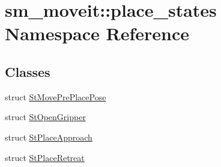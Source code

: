\hypertarget{namespacesm__moveit_1_1place__states}{}\section{sm\+\_\+moveit\+:\+:place\+\_\+states Namespace Reference}
\label{namespacesm__moveit_1_1place__states}
\subsection*{Classes}
\begin{DoxyCompactItemize}
\item 
struct \hyperlink{structsm__moveit_1_1place__states_1_1StMovePrePlacePose}{St\+Move\+Pre\+Place\+Pose}
\item 
struct \hyperlink{structsm__moveit_1_1place__states_1_1StOpenGripper}{St\+Open\+Gripper}
\item 
struct \hyperlink{structsm__moveit_1_1place__states_1_1StPlaceApproach}{St\+Place\+Approach}
\item 
struct \hyperlink{structsm__moveit_1_1place__states_1_1StPlaceRetreat}{St\+Place\+Retreat}
\end{DoxyCompactItemize}
